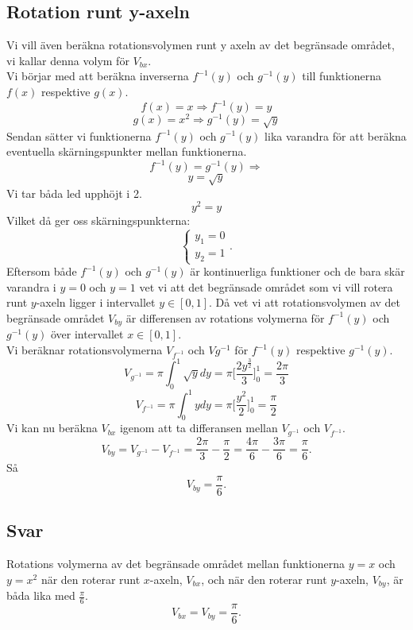 \documentclass[11pt]{article}
\begin{document}
\subsection{Rotation runt y-axeln}
Vi vill även beräkna rotationsvolymen runt y axeln av det begränsade området, vi kallar denna volym för $V_{bx}$.\\

Vi börjar med att beräkna inverserna $f^{-1}(y)$ och $g^{-1}(y)$ till funktionerna $f(x)$ respektive $g(x)$.
$$f(x) = x \Rightarrow f^{-1}(y) = y$$
$$g(x) = x^2 \Rightarrow g^{-1}(y) = \sqrt{y}$$
Sendan sätter vi funktionerna $f^{-1}(y)$ och $g^{-1}(y)$ lika varandra för att beräkna eventuella skärningspunkter mellan funktionerna.
$$ f^{-1}(y) = g^{-1}(y) \Rightarrow$$
$$ y = \sqrt{y} $$
Vi tar båda led upphöjt i 2.
$$ y^2 = y$$
Vilket då ger oss skärningspunkterna:
$$\left\{\begin{array}{c}
y_1 = 0 \\ y_2 = 1
\end{array}\right. .$$ 
Eftersom både $f^{-1}(y)$ och $g^{-1}(y)$ är kontinuerliga funktioner och de bara skär varandra i $y=0$ och $y=1$ vet vi att det begränsade området som vi vill rotera runt $y$-axeln ligger  i intervallet $y\in[0,1]$. Då vet vi att rotationsvolymen av det begränsade området $V_{by}$ är differensen av rotations volymerna för $f^{-1}(y)$ och $g^{-1}(y)$ över intervallet $x\in[0,1]$.\\
Vi beräknar rotationsvolymerna $V_{f^{-1}}$ och $V{g^{-1}}$ för $f^{-1}(y)$ respektive $g^{-1}(y)$.
$$V_{g^{-1}} = \pi \int_0^1 \sqrt{y} dy = \pi \Big[\frac{2 y^{\frac{3}{2}}}{3}\Big]_0^1 = \frac{2\pi}{3}$$
$$V_{f^{-1}} = \pi \int_0^1 y dy = \pi\Big[\frac{y^2}{2}\Big]_0^1 = \frac{\pi}{2}$$
Vi kan nu beräkna $V_{bx}$ igenom att ta differansen mellan $V_{g^{-1}}$ och $V_{f^{-1}}$.
$$V_{by} = V_{g^{-1}} - V_{f^{-1}} =\frac{2\pi}{3} - \frac{\pi}{2} = \frac{4\pi}{6} - \frac{3\pi}{6} = \frac{\pi}{6}.$$
Så
$$V_{by} =  \frac{\pi}{6}.$$
\subsection{Svar}
Rotations volymerna av det begränsade området mellan funktionerna $y = x$ och $y = x^2$ när den roterar runt $x$-axeln, $V_{bx}$, och när den roterar runt $y$-axeln, $V_{by}$, är båda lika med $\frac{\pi}{6}$.
$$V_{bx} = V_{by} = \frac{\pi}{6}.$$
\end{document}
